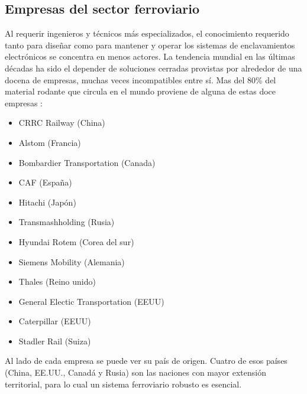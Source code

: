 \subsection{Empresas del sector ferroviario}

    Al requerir ingenieros y técnicos más especializados, el conocimiento requerido tanto para diseñar como para mantener y operar los sistemas de enclavamientos electrónicos se concentra en menos actores. La tendencia mundial en las últimas décadas ha sido el depender de soluciones cerradas provistas por alrededor de una docena de empresas, muchas veces incompatibles entre sí. Mas del 80\% del material rodante que circula en el mundo proviene de alguna de estas doce empresas \cite{MARKET}:

    \begin{itemize}
        \item CRRC Railway (China) \cite{CRRC}
        \item Alstom (Francia) \cite{ALSTOM}
        \item Bombardier Transportation (Canada) \cite{BOMBARDIER}
        \item CAF (España) \cite{CAF}
        \item Hitachi (Japón) \cite{HITACHI}
        \item Transmashholding (Rusia) \cite{TRANSMASHHOLDING}
        \item Hyundai Rotem (Corea del sur) \cite{HYUNDAI}
        \item Siemens Mobility (Alemania) \cite{SIEMENS}
        \item Thales (Reino unido) \cite{THALES}
        \item General Electic Transportation (EEUU) \cite{GENERAL}
        \item Caterpillar (EEUU) \cite{CATERPILLAR}
        \item Stadler Rail (Suiza) \cite{STADLER}
    \end{itemize}
    
    Al lado de cada empresa se puede ver su país de origen. Cuatro de esos países (China, EE.UU., Canadá y Rusia) son las naciones con mayor extensión territorial, para lo cual un sistema ferroviario robusto es esencial. %

    